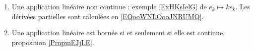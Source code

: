 
\begin{enumerate}
    \item
        Une application linéaire non continue : exemple \ref{ExHKsIelG} de \( e_k\mapsto ke_k\). Les dérivées partielles sont calculées en \eqref{EQooWNLOooJNRUMQ}.
    \item
        Une application linéaire est bornée si et seulement si elle est continue, proposition \ref{PropmEJjLE}.
\end{enumerate}

